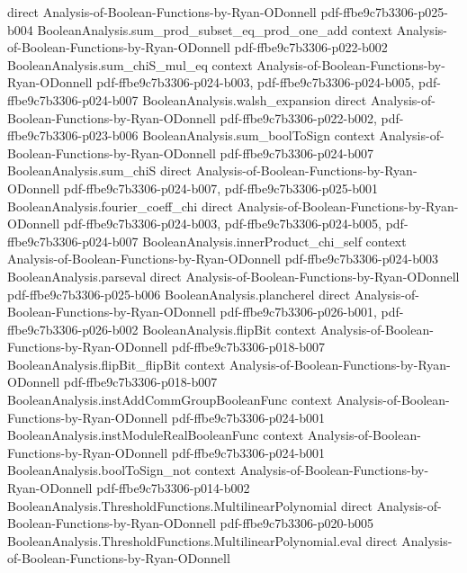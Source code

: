 \begin{lemma}
  {direct}
  {Analysis-of-Boolean-Functions-by-Ryan-ODonnell}
  {pdf-ffbe9c7b3306-p025-b004}
\proofstep
  {BooleanAnalysis.sum_prod_subset_eq_prod_one_add}
  {context}
  {Analysis-of-Boolean-Functions-by-Ryan-ODonnell}
  {pdf-ffbe9c7b3306-p022-b002}
\proofstep
  {BooleanAnalysis.sum_chiS_mul_eq}
  {context}
  {Analysis-of-Boolean-Functions-by-Ryan-ODonnell}
  {pdf-ffbe9c7b3306-p024-b003,
    pdf-ffbe9c7b3306-p024-b005,
    pdf-ffbe9c7b3306-p024-b007}
\proofstep
  {BooleanAnalysis.walsh_expansion}
  {direct}
  {Analysis-of-Boolean-Functions-by-Ryan-ODonnell}
  {pdf-ffbe9c7b3306-p022-b002,
    pdf-ffbe9c7b3306-p023-b006}
\proofstep
  {BooleanAnalysis.sum_boolToSign}
  {context}
  {Analysis-of-Boolean-Functions-by-Ryan-ODonnell}
  {pdf-ffbe9c7b3306-p024-b007}
\proofstep
  {BooleanAnalysis.sum_chiS}
  {direct}
  {Analysis-of-Boolean-Functions-by-Ryan-ODonnell}
  {pdf-ffbe9c7b3306-p024-b007,
    pdf-ffbe9c7b3306-p025-b001}
\proofstep
  {BooleanAnalysis.fourier_coeff_chi}
  {direct}
  {Analysis-of-Boolean-Functions-by-Ryan-ODonnell}
  {pdf-ffbe9c7b3306-p024-b003,
    pdf-ffbe9c7b3306-p024-b005,
    pdf-ffbe9c7b3306-p024-b007}
\proofstep
  {BooleanAnalysis.innerProduct_chi_self}
  {context}
  {Analysis-of-Boolean-Functions-by-Ryan-ODonnell}
  {pdf-ffbe9c7b3306-p024-b003}
\proofstep
  {BooleanAnalysis.parseval}
  {direct}
  {Analysis-of-Boolean-Functions-by-Ryan-ODonnell}
  {pdf-ffbe9c7b3306-p025-b006}
\proofstep
  {BooleanAnalysis.plancherel}
  {direct}
  {Analysis-of-Boolean-Functions-by-Ryan-ODonnell}
  {pdf-ffbe9c7b3306-p026-b001,
    pdf-ffbe9c7b3306-p026-b002}
\proofstep
  {BooleanAnalysis.flipBit}
  {context}
  {Analysis-of-Boolean-Functions-by-Ryan-ODonnell}
  {pdf-ffbe9c7b3306-p018-b007}
\proofstep
  {BooleanAnalysis.flipBit_flipBit}
  {context}
  {Analysis-of-Boolean-Functions-by-Ryan-ODonnell}
  {pdf-ffbe9c7b3306-p018-b007}
\proofstep
  {BooleanAnalysis.instAddCommGroupBooleanFunc}
  {context}
  {Analysis-of-Boolean-Functions-by-Ryan-ODonnell}
  {pdf-ffbe9c7b3306-p024-b001}
\proofstep
  {BooleanAnalysis.instModuleRealBooleanFunc}
  {context}
  {Analysis-of-Boolean-Functions-by-Ryan-ODonnell}
  {pdf-ffbe9c7b3306-p024-b001}
\proofstep
  {BooleanAnalysis.boolToSign_not}
  {context}
  {Analysis-of-Boolean-Functions-by-Ryan-ODonnell}
  {pdf-ffbe9c7b3306-p014-b002}
\proofstep
  {BooleanAnalysis.ThresholdFunctions.MultilinearPolynomial}
  {direct}
  {Analysis-of-Boolean-Functions-by-Ryan-ODonnell}
  {pdf-ffbe9c7b3306-p020-b005}
\proofstep
  {BooleanAnalysis.ThresholdFunctions.MultilinearPolynomial.eval}
  {direct}
  {Analysis-of-Boolean-Functions-by-Ryan-ODonnell}

\end{lemma}
